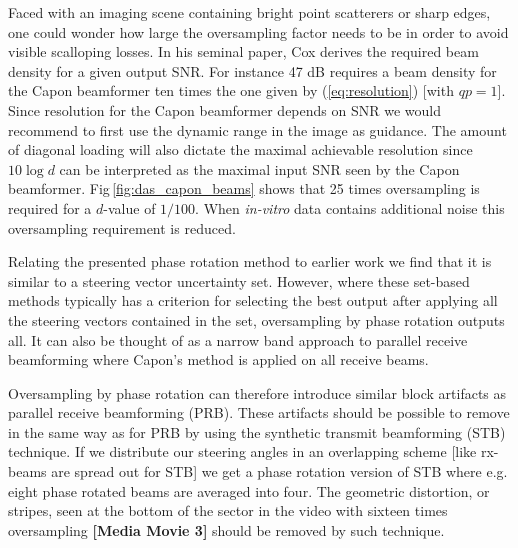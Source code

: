 \documentclass[draftcls]{IEEEtran}
\newcommand\multimedia[1]{\textbf{{\color{red}[#1]}}}
\begin{document}
Faced with an imaging scene containing bright point scatterers or sharp edges, one could wonder how large the oversampling factor needs to be in order to avoid visible scalloping losses. In his seminal paper, Cox \cite{Cox1973} derives the required beam density for a given output SNR. For instance 47 dB requires a beam density for the Capon beamformer ten times the one given by (\ref{eq:resolution}) [with $qp=1$]. Since resolution for the Capon beamformer depends on SNR we would recommend to first use the dynamic range in the image as guidance. The amount of diagonal loading will also dictate the maximal achievable resolution since $10\log{d}$ can be interpreted as the maximal input SNR seen by the Capon beamformer. Fig\,\ref{fig:das_capon_beams} shows that 25 times oversampling is required for a $d$-value of $1/100$. When \textit{in-vitro} data contains additional noise this oversampling requirement is reduced.%

Relating the presented phase rotation method to earlier work we find that it is similar to a steering vector uncertainty set. However, where these set-based methods typically has a criterion for selecting the best output after applying all the steering vectors contained in the set, oversampling by phase rotation outputs all. It can also be thought of as a narrow band approach to parallel receive beamforming where Capon's method is applied on all receive beams.

Oversampling by phase rotation can therefore introduce similar block artifacts as parallel receive beamforming (PRB). These artifacts should be possible to remove in the same way as for PRB by using the synthetic transmit beamforming (STB) technique. If we distribute our steering angles in an overlapping scheme [like rx-beams are spread out for STB] we get a phase rotation version of STB where e.g. eight phase rotated beams are averaged into four. The geometric distortion, or stripes, seen at the bottom of the sector in the video with sixteen times oversampling \multimedia{Media Movie 3} should be removed by such technique.
\end{document}
